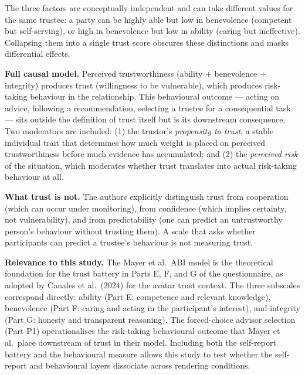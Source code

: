 \documentclass[11pt, a4paper]{article}
\begin{document}
The three factors are conceptually independent and can take different values for the same trustee: a party can be highly able but low in benevolence (competent but self-serving), or high in benevolence but low in ability (caring but ineffective). Collapsing them into a single trust score obscures these distinctions and masks differential effects.

\textbf{Full causal model.} Perceived trustworthiness (ability + benevolence + integrity) produces trust (willingness to be vulnerable), which produces risk-taking behaviour in the relationship. This behavioural outcome --- acting on advice, following a recommendation, selecting a trustee for a consequential task --- sits outside the definition of trust itself but is its downstream consequence. Two moderators are included: (1) the trustor's \textit{propensity to trust}, a stable individual trait that determines how much weight is placed on perceived trustworthiness before much evidence has accumulated; and (2) the \textit{perceived risk} of the situation, which moderates whether trust translates into actual risk-taking behaviour at all.

\textbf{What trust is not.} The authors explicitly distinguish trust from cooperation (which can occur under monitoring), from confidence (which implies certainty, not vulnerability), and from predictability (one can predict an untrustworthy person's behaviour without trusting them). A scale that asks whether participants can predict a trustee's behaviour is not measuring trust.

\textbf{Relevance to this study.} The Mayer et al.\ ABI model is the theoretical foundation for the trust battery in Parts E, F, and G of the questionnaire, as adopted by Canales et al.\ (2024) for the avatar trust context. The three subscales correspond directly: ability (Part E: competence and relevant knowledge), benevolence (Part F: caring and acting in the participant's interest), and integrity (Part G: honesty and transparent reasoning). The forced-choice advisor selection (Part P1) operationalises the risk-taking behavioural outcome that Mayer et al.\ place downstream of trust in their model. Including both the self-report battery and the behavioural measure allows this study to test whether the self-report and behavioural layers dissociate across rendering conditions.
\end{document}
